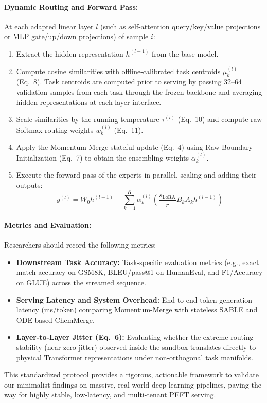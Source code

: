 \documentclass{article}
\theoremstyle{plain}
\theoremstyle{definition}
\theoremstyle{remark}
\begin{document}
\paragraph{Dynamic Routing and Forward Pass:} At each adapted linear layer $l$ (such as self-attention query/key/value projections or MLP gate/up/down projections) of sample $i$:
\begin{enumerate}
    \item Extract the hidden representation $h^{(l-1)}$ from the base model.
    \item Compute cosine similarities with offline-calibrated task centroids $\mu_k^{(l)}$ (Eq.~8). Task centroids are computed prior to serving by passing 32--64 validation samples from each task through the frozen backbone and averaging hidden representations at each layer interface.
    \item Scale similarities by the running temperature $\tau^{(l)}$ (Eq.~10) and compute raw Softmax routing weights $w_k^{(l)}$ (Eq.~11).
    \item Apply the Momentum-Merge stateful update (Eq.~4) using Raw Boundary Initialization (Eq.~7) to obtain the ensembling weights $\alpha_k^{(l)}$.
    \item Execute the forward pass of the experts in parallel, scaling and adding their outputs:
    \begin{equation}
        y^{(l)} = W_0 h^{(l-1)} + \sum_{k=1}^K \alpha_k^{(l)} \left(\frac{s_{\text{LoRA}}}{r} B_k A_k h^{(l-1)}\right)
    \end{equation}
\end{enumerate}

\paragraph{Metrics and Evaluation:} Researchers should record the following metrics:
\begin{itemize}
    \item \textbf{Downstream Task Accuracy:} Task-specific evaluation metrics (e.g., exact match accuracy on GSM8K, BLEU/pass@1 on HumanEval, and F1/Accuracy on GLUE) across the streamed sequence.
    \item \textbf{Serving Latency and System Overhead:} End-to-end token generation latency (ms/token) comparing Momentum-Merge with stateless SABLE and ODE-based ChemMerge.
    \item \textbf{Layer-to-Layer Jitter (Eq.~6):} Evaluating whether the extreme routing stability (near-zero jitter) observed inside the sandbox translates directly to physical Transformer representations under non-orthogonal task manifolds.
\end{itemize}
This standardized protocol provides a rigorous, actionable framework to validate our minimalist findings on massive, real-world deep learning pipelines, paving the way for highly stable, low-latency, and multi-tenant PEFT serving.
\end{document}
